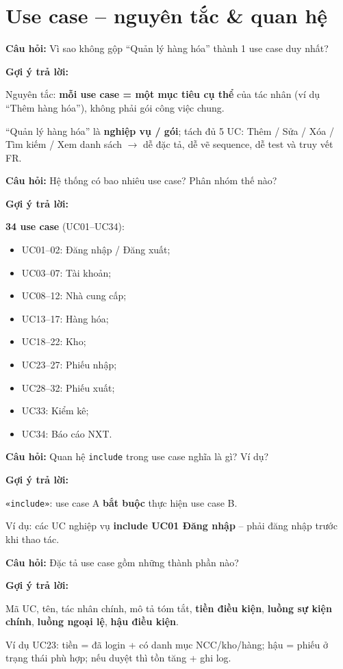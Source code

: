 \documentclass[12pt,a4paper]{article}
\newcommand{\cau}[1]{\textbf{\textcolor{qblue}{Câu hỏi:}} #1}
\newcommand{\traloi}{\par\smallskip\textbf{\textcolor{qblue!70!black}{Gợi ý trả lời:}}\par}
\begin{document}
\section{Use case -- nguyên tắc \& quan hệ}

\begin{cauhoi}
\cau{Vì sao không gộp ``Quản lý hàng hóa'' thành 1 use case duy nhất?}
\traloi
Nguyên tắc: \textbf{mỗi use case = một mục tiêu cụ thể} của tác nhân (ví dụ ``Thêm hàng hóa''), không phải gói công việc chung.

``Quản lý hàng hóa'' là \textbf{nghiệp vụ / gói}; tách đủ 5 UC: Thêm / Sửa / Xóa / Tìm kiếm / Xem danh sách $\rightarrow$ dễ đặc tả, dễ vẽ sequence, dễ test và truy vết FR.
\end{cauhoi}

\begin{cauhoi}[Câu 14]
\cau{Hệ thống có bao nhiêu use case? Phân nhóm thế nào?}
\traloi
\textbf{34 use case} (UC01--UC34):
\begin{itemize}[leftmargin=1.4em,itemsep=2pt]
  \item UC01--02: Đăng nhập / Đăng xuất;
  \item UC03--07: Tài khoản;
  \item UC08--12: Nhà cung cấp;
  \item UC13--17: Hàng hóa;
  \item UC18--22: Kho;
  \item UC23--27: Phiếu nhập;
  \item UC28--32: Phiếu xuất;
  \item UC33: Kiểm kê;
  \item UC34: Báo cáo NXT.
\end{itemize}
\end{cauhoi}

\begin{cauhoi}[Câu 15]
\cau{Quan hệ \texttt{include} trong use case nghĩa là gì? Ví dụ?}
\traloi
\texttt{«include»}: use case A \textbf{bắt buộc} thực hiện use case B.

Ví dụ: các UC nghiệp vụ \textbf{include UC01 Đăng nhập} -- phải đăng nhập trước khi thao tác.
\end{cauhoi}

\begin{cauhoi}[Câu 16]
\cau{Đặc tả use case gồm những thành phần nào?}
\traloi
Mã UC, tên, tác nhân chính, mô tả tóm tắt, \textbf{tiền điều kiện}, \textbf{luồng sự kiện chính}, \textbf{luồng ngoại lệ}, \textbf{hậu điều kiện}.

Ví dụ UC23: tiền = đã login + có danh mục NCC/kho/hàng; hậu = phiếu ở trạng thái phù hợp; nếu duyệt thì tồn tăng + ghi log.
\end{cauhoi}
\end{document}
